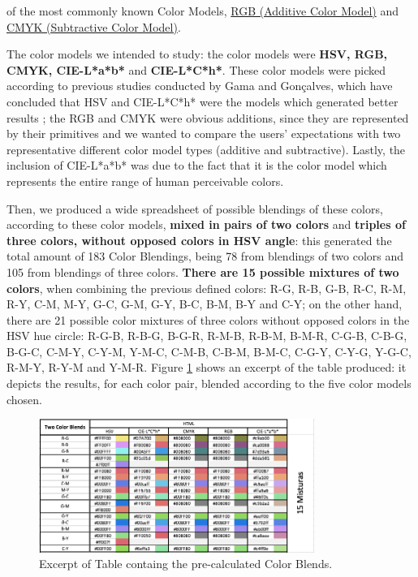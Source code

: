 of the most commonly known Color Models, \ul{RGB (Additive Color Model)} and \ul{CMYK (Subtractive Color Model)}. \par
%
The color models we intended to study: the color models were \textbf{HSV, RGB, CMYK, CIE-L*a*b*} and \textbf{CIE-L*C*h*}.
These color models were picked according to previous studies conducted by Gama and Gonçalves, which have concluded that HSV
and CIE-L*C*h* were the models which generated better results \cite{Gama20141,Gama20142}; the RGB and CMYK were obvious
additions, since they are represented by their primitives and we wanted to compare the users' expectations with two
representative different color model types (additive and subtractive). Lastly, the inclusion of CIE-L*a*b* was due to the fact
that it is the color model which represents the entire range of human perceivable colors. \par
%
Then, we produced a wide spreadsheet of possible blendings of these colors, according to these color models, \textbf{mixed in
pairs of two colors} and \textbf{triples of three colors, without opposed colors in HSV angle}: this generated the total amount
of 183 Color Blendings, being 78 from blendings of two colors and 105 from blendings of three colors. \textbf{There are 15
possible mixtures of two colors}, when combining the previous defined colors: R-G, R-B, G-B, R-C, R-M, R-Y, C-M, M-Y, G-C, G-M,
G-Y, B-C, B-M, B-Y and C-Y; on the other hand, there are 21 possible color mixtures of three colors without opposed colors in the
HSV hue circle: R-G-B, R-B-G, B-G-R, R-M-B, R-B-M, B-M-R, C-G-B, C-B-G, B-G-C, C-M-Y, C-Y-M, Y-M-C, C-M-B, C-B-M, B-M-C, C-G-Y,
C-Y-G, Y-G-C, R-M-Y, R-Y-M and Y-M-R. Figure \ref{fig:table_blends} shows an excerpt of the table produced: it depicts the results,
for each color pair, blended according to the five color models chosen.
%
\begin{figure}[htbp]
	\centering
  \includegraphics[width=0.8\textwidth]{images/implementation/table_blends.png}
  \caption[Excerpt of Table containg the pre-calculated Color Blends.]{Excerpt of Table containg the pre-calculated Color Blends.}
  \label{fig:table_blends}
\end{figure} \par
